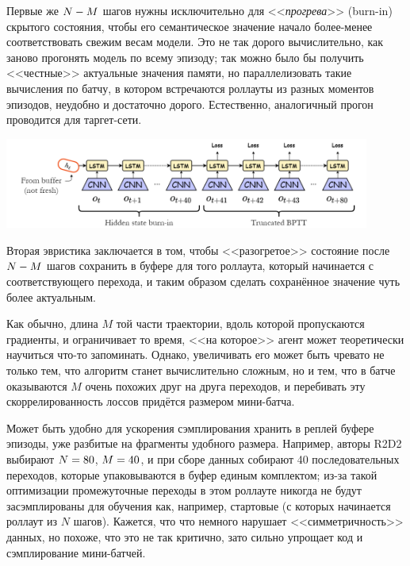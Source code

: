 Первые же $N \HM- M$ шагов нужны исключительно для <<\emph{прогрева}>> (burn-in) скрытого состояния, чтобы его семантическое значение начало более-менее соответствовать свежим весам модели. Это не так дорого вычислительно, как заново прогонять модель по всему эпизоду; так можно было бы получить <<честные>> актуальные значения памяти, но параллелизовать такие вычисления по батчу, в котором встречаются роллауты из разных моментов эпизодов, неудобно и достаточно дорого. Естественно, аналогичный прогон проводится для таргет-сети.

\begin{center}
    \includegraphics[width=0.9\textwidth]{Images/R2D2.png}
\end{center}

Вторая эвристика заключается в том, чтобы <<разогретое>> состояние после $N \HM- M$ шагов сохранить в буфере для того роллаута, который начинается с соответствующего перехода, и таким образом сделать сохранённое значение чуть более актуальным.

Как обычно, длина $M$ той части траектории, вдоль которой пропускаются градиенты, и ограничивает то время, <<на которое>> агент может теоретически научиться что-то запоминать. Однако, увеличивать его может быть чревато не только тем, что алгоритм станет вычислительно сложным, но и тем, что в батче оказываются $M$ очень похожих друг на друга переходов, и перебивать эту скоррелированность лоссов придётся размером мини-батча.

\begin{remark}
Может быть удобно для ускорения сэмплирования хранить в реплей буфере эпизоды, уже разбитые на фрагменты удобного размера. Например, авторы R2D2 выбирают $N \HM= 80$, $M \HM= 40$, и при сборе данных собирают 40 последовательных переходов, которые упаковываются в буфер единым комплектом; из-за такой оптимизации промежуточные переходы в этом роллауте никогда не будут засэмплированы для обучения как, например, стартовые (с которых начинается роллаут из $N$ шагов). Кажется, что что немного нарушает <<симметричность>> данных, но похоже, что это не так критично, зато сильно упрощает код и сэмплирование мини-батчей.
\end{remark}

